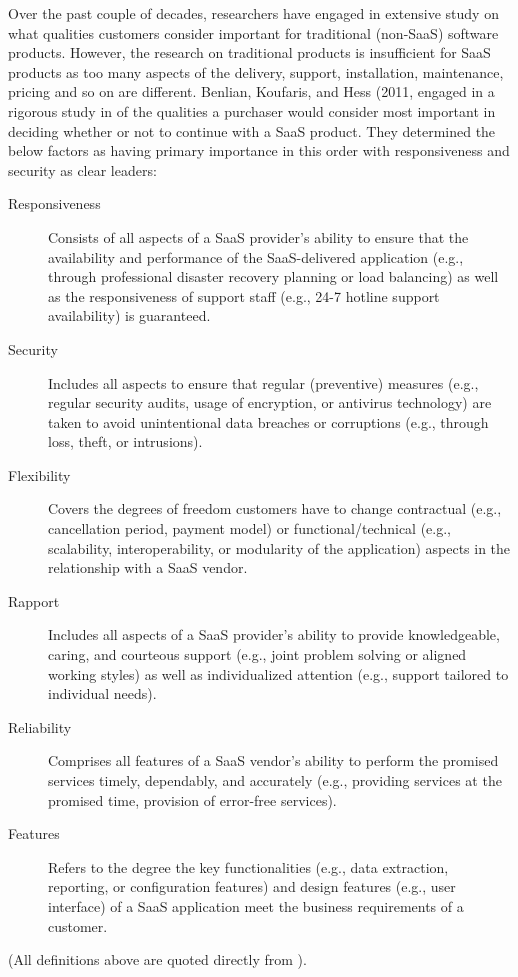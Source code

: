 \documentclass[10pt]{article}
\begin{document}
Over the past couple of decades, researchers have engaged in extensive study on what qualities customers consider important for traditional (non-SaaS) software products.
However, the research on traditional products is insufficient for SaaS products as too many aspects of the delivery, support, installation, maintenance, pricing and so on are different.
Benlian, Koufaris, and Hess (2011, \cite{saasqual} engaged in a rigorous study in \cite{saasqual} of the qualities a purchaser would consider most important in deciding whether or not to continue with a SaaS product.
They determined the below factors as having primary importance in this order with responsiveness and security as clear leaders:
\begin{description}
	\item[Responsiveness]
	Consists of all aspects of a SaaS provider’s ability to ensure that the availability and performance of the SaaS-delivered application (e.g., through professional disaster recovery planning or load balancing) as well as the responsiveness of support staff (e.g., 24-7 hotline support availability) is guaranteed.
	\item[Security]
	Includes all aspects to ensure that regular (preventive) measures (e.g., regular security audits, usage of encryption, or antivirus technology) are taken to avoid unintentional data breaches or corruptions (e.g., through loss, theft, or intrusions).
	\item[Flexibility]
	Covers the degrees of freedom customers have to change contractual (e.g., cancellation period, payment model) or functional/technical (e.g., scalability, interoperability, or modularity of the application) aspects in the relationship with a SaaS vendor.
	\item[Rapport]
	Includes all aspects of a SaaS provider’s ability to provide knowledgeable, caring, and courteous support (e.g., joint problem solving or aligned working styles) as well as individualized attention (e.g., support tailored to individual needs).
	\item[Reliability]
	Comprises all features of a SaaS vendor’s ability to perform the promised services timely, dependably, and accurately (e.g., providing services at the promised time, provision of error-free services).
	\item[Features]
	Refers to the degree the key functionalities (e.g., data extraction, reporting, or configuration features) and design features (e.g., user interface) of a SaaS application meet the business requirements of a customer.
\end{description}
(All definitions above are quoted directly from \cite{saasqual}).
\end{document}
